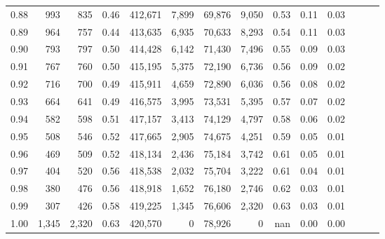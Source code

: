\begin{tabular}{rrrrrrrrrrrrrr}
0.88 &     993 &    835 &  0.46 &  412,671 &    7,899 &  69,876 &   9,050 &  0.53 &  0.11 &      0.03 \\
0.89 &     964 &    757 &  0.44 &  413,635 &    6,935 &  70,633 &   8,293 &  0.54 &  0.11 &      0.03 \\
0.90 &     793 &    797 &  0.50 &  414,428 &    6,142 &  71,430 &   7,496 &  0.55 &  0.09 &      0.03 \\
0.91 &     767 &    760 &  0.50 &  415,195 &    5,375 &  72,190 &   6,736 &  0.56 &  0.09 &      0.02 \\
0.92 &     716 &    700 &  0.49 &  415,911 &    4,659 &  72,890 &   6,036 &  0.56 &  0.08 &      0.02 \\
0.93 &     664 &    641 &  0.49 &  416,575 &    3,995 &  73,531 &   5,395 &  0.57 &  0.07 &      0.02 \\
0.94 &     582 &    598 &  0.51 &  417,157 &    3,413 &  74,129 &   4,797 &  0.58 &  0.06 &      0.02 \\
0.95 &     508 &    546 &  0.52 &  417,665 &    2,905 &  74,675 &   4,251 &  0.59 &  0.05 &      0.01 \\
0.96 &     469 &    509 &  0.52 &  418,134 &    2,436 &  75,184 &   3,742 &  0.61 &  0.05 &      0.01 \\
0.97 &     404 &    520 &  0.56 &  418,538 &    2,032 &  75,704 &   3,222 &  0.61 &  0.04 &      0.01 \\
0.98 &     380 &    476 &  0.56 &  418,918 &    1,652 &  76,180 &   2,746 &  0.62 &  0.03 &      0.01 \\
0.99 &     307 &    426 &  0.58 &  419,225 &    1,345 &  76,606 &   2,320 &  0.63 &  0.03 &      0.01 \\
1.00 &   1,345 &  2,320 &  0.63 &  420,570 &        0 &  78,926 &       0 &   nan &  0.00 &      0.00 \\
\bottomrule
\end{tabular}
